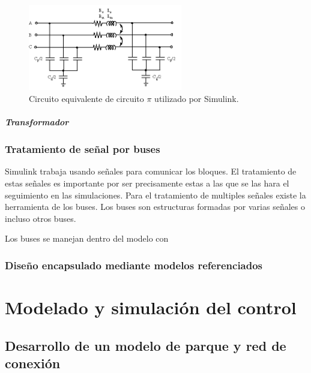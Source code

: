 \documentclass{book}
\begin{document}
\begin{figure}[h!]
\centering
\includegraphics[width=0.6\textwidth]{PiSectionSimulink.PNG}
\caption{Circuito equivalente de circuito $\pi$ utilizado por Simulink. }
\label{PiSectionSimulink}
\end{figure} \par

		\paragraph{Transformador}

		\subsection{Tratamiento de señal por buses}

Simulink trabaja usando señales para comunicar los bloques. El tratamiento de estas señales es importante por ser precisamente estas a las que se las hara el seguimiento en las simulaciones. Para el tratamiento de multiples señales existe la herramienta de los buses. Los buses son estructuras formadas por varias señales o incluso otros buses. \par

Los buses se manejan dentro del modelo con 

		\subsection{Diseño encapsulado mediante modelos referenciados}

\chapter{Modelado y simulaci\'on del control}

	\section{Desarrollo de un modelo de parque y red de conexi\'on}
\end{document}
